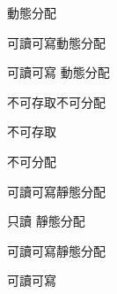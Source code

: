 \bTABLE
\setupTABLE[c][each][align={middle,lohi}]

\bTABLEhead
\bTR
\bTD \eTD
\bTD{}\eTD \bTD{}\eTD
\bTD{}\eTD \bTD{}\eTD
\eTR
\eTABLEhead

\bTABLEbody
\bTR
\bTD{}\eTD
\bTD 動態分配\par 可讀可寫\eTD \bTD 動態分配\par 可讀可寫\eTD
\bTD 動態分配\par 不可存取\eTD \bTD 不可分配\par 不可存取\eTD
\eTR

\bTR
\bTD{}\eTD
\bTD 不可分配\par 可讀可寫\eTD \bTD 靜態分配\par 只讀\eTD
\bTD 靜態分配\par 可讀可寫\eTD \bTD 靜態分配\par 可讀可寫\eTD
\eTR
\eTABLEbody

\eTABLE

